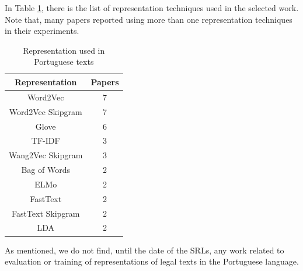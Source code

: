 In Table \ref{tab:rsl_representation_portuguese}, there is the list of representation techniques used in the selected work. Note that, many papers reported using more than one representation techniques in their experiments.

\begin{table}[htb]
\centering
\caption{Representation used in Portuguese texts}
\label{tab:rsl_representation_portuguese}
\footnotesize
\begin{tabular}{cc}
\hline
\textbf{Representation} & \textbf{Papers} \\ \hline
Word2Vec                & 7               \\
Word2Vec Skipgram       & 7               \\
Glove                   & 6               \\
TF-IDF                  & 3               \\
Wang2Vec Skipgram       & 3               \\
Bag of Words            & 2               \\
ELMo                    & 2               \\
FastText                & 2               \\
FastText Skipgram       & 2               \\
LDA                     & 2              \\ \bottomrule
\end{tabular}
\end{table}


As mentioned, we do not find, until the date of the SRLs, any work related to evaluation or training of representations of  legal texts in the Portuguese language.

